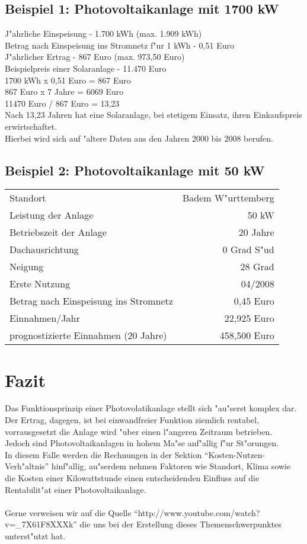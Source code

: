 \documentclass[12pt,titlepage]{article}
\begin{document}
\subsection{Beispiel 1: Photovoltaikanlage mit 1700 kW}
J"ahrliche Einspeisung - 1.700 kWh (max. 1.909 kWh)\\
Betrag nach Einspeisung ins Stromnetz f"ur 1 kWh - 0,51 Euro\\
J"ahrlicher Ertrag - 867 Euro (max. 973,50 Euro)\\
Beispielpreis einer Solaranlage - 11.470 Euro\\
1700 kWh x 0,51 Euro = 867 Euro\\
867 Euro x 7 Jahre = 6069 Euro\\
11470 Euro / 867 Euro = 13,23 \\
Nach 13,23 Jahren hat eine Solaranlage, bei stetigem Einsatz, ihren Einkaufspreis erwirtschaftet.\\
Hierbei wird sich auf "altere Daten aus den Jahren 2000 bis 2008 berufen.\\

\subsection{Beispiel 2: Photovoltaikanlage mit 50 kW}
\begin{tabular}{|l|r|}
  \hline\hline
  Standort & Badem W"urttemberg\\
  Leistung der Anlage & 50 kW\\
  Betriebszeit der Anlage & 20 Jahre\\
  Dachausrichtung & 0 Grad S"ud\\
  Neigung & 28 Grad\\
  Erste Nutzung & 04/2008\\
  Betrag nach Einspeisung ins Stromnetz & 0,45 Euro\\
  Einnahmen/Jahr & 22,925 Euro \\
  prognostizierte Einnahmen (20 Jahre) & 458,500 Euro\\
  \hline 
\end{tabular}

\newpage



\section{Fazit}
Das Funktionsprinzip einer Photovolatikanlage stellt sich "au"serst komplex dar.\\
Der Ertrag, dagegen, ist bei einwandfreier Funktion ziemlich rentabel, vorrausgesetzt die Anlage wird "uber einen l"angeren Zeitraum betrieben.\\
Jedoch sind Photovoltaikanlagen in hohem Ma"se anf"allig f"ur St"orungen.\\
In diesem Falle werden die Rechnungen in der Sektion "`Kosten-Nutzen-Verh"altnis"' hinf"allig, au"serdem nehmen Faktoren wie Standort, Klima sowie die Kosten einer Kilowattstunde einen entscheidenden Einfluss auf die Rentabilit"at einer Photovoltaikanlage.\\\\
Gerne verweisen wir auf die Quelle "`http://www.youtube.com/watch?v=\_7X61F8XXXk"' die uns bei der Erstellung dieses Themenschwerpunktes unterst"utzt hat.
\end{document}
